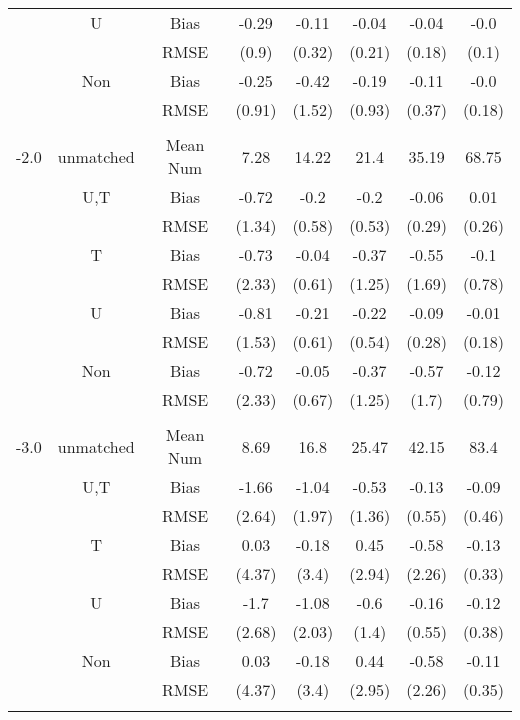 \begin{tabular}{@{\extracolsep{5pt}}lc|cccccc}
 & U & Bias & -0.29 & -0.11 & -0.04 & -0.04 & -0.0 \\
 &  & RMSE & (0.9) & (0.32) & (0.21) & (0.18) & (0.1) \\
 & Non & Bias & -0.25 & -0.42 & -0.19 & -0.11 & -0.0 \\
 &  & RMSE & (0.91) & (1.52) & (0.93) & (0.37) & (0.18) \\
 &  &  &  &  &  &  &  \\
-2.0 & unmatched & Mean Num & 7.28 & 14.22 & 21.4 & 35.19 & 68.75 \\
 & U,T & Bias & -0.72 & -0.2 & -0.2 & -0.06 & 0.01 \\
 &  & RMSE & (1.34) & (0.58) & (0.53) & (0.29) & (0.26) \\
 & T & Bias & -0.73 & -0.04 & -0.37 & -0.55 & -0.1 \\
 &  & RMSE & (2.33) & (0.61) & (1.25) & (1.69) & (0.78) \\
 & U & Bias & -0.81 & -0.21 & -0.22 & -0.09 & -0.01 \\
 &  & RMSE & (1.53) & (0.61) & (0.54) & (0.28) & (0.18) \\
 & Non & Bias & -0.72 & -0.05 & -0.37 & -0.57 & -0.12 \\
 &  & RMSE & (2.33) & (0.67) & (1.25) & (1.7) & (0.79) \\
 &  &  &  &  &  &  &  \\
-3.0 & unmatched & Mean Num & 8.69 & 16.8 & 25.47 & 42.15 & 83.4 \\
 & U,T & Bias & -1.66 & -1.04 & -0.53 & -0.13 & -0.09 \\
 &  & RMSE & (2.64) & (1.97) & (1.36) & (0.55) & (0.46) \\
 & T & Bias & 0.03 & -0.18 & 0.45 & -0.58 & -0.13 \\
 &  & RMSE & (4.37) & (3.4) & (2.94) & (2.26) & (0.33) \\
 & U & Bias & -1.7 & -1.08 & -0.6 & -0.16 & -0.12 \\
 &  & RMSE & (2.68) & (2.03) & (1.4) & (0.55) & (0.38) \\
 & Non & Bias & 0.03 & -0.18 & 0.44 & -0.58 & -0.11 \\
 &  & RMSE & (4.37) & (3.4) & (2.95) & (2.26) & (0.35) \\
 &  &  &  &  &  &  &  \\
\hline 
\bottomrule 
\end{tabular}
